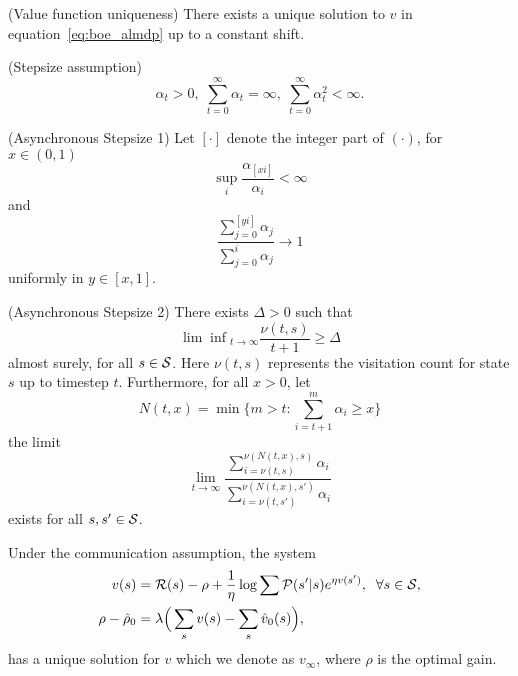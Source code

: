 
\begin{assumption}
 (Value function uniqueness) There exists a unique solution to $v$ in equation~\eqref{eq:boe_almdp} up to a constant shift.
  \label{ass:uniqueness}
\end{assumption}
\begin{assumption} (Stepsize assumption)
    \begin{equation*}
        \alpha_t > 0,\;\sum_{t=0}^{\infty} \alpha_t = \infty,\;\sum_{t=0}^{\infty} \alpha_t^2 < \infty.
    \end{equation*}
      \label{ass:stepsize1}
\end{assumption}
\begin{assumption}
    (Asynchronous Stepsize 1) Let $[\cdot]$ denote the integer part of $(\cdot)$, for $x\in(0, 1)$
    \begin{equation*}
        \sup_i \frac{\alpha_{[xi]}}{\alpha_i} < \infty
    \end{equation*}
    and
    \begin{equation*}
        \frac{\sum_{j=0}^{[yi]}\alpha_j}{\sum_{j=0}^i\alpha_j}\rightarrow 1
    \end{equation*}
    \label{ass:stepsize2}
    uniformly in $y \in[x, 1]$.
\end{assumption}

\begin{assumption}
    (Asynchronous Stepsize 2) There exists $\Delta>0$ such that
    \begin{equation*}
        {\lim\inf}_{t\rightarrow\infty} \frac{\nu(t, s)}{t+1}\geq \Delta
    \end{equation*}
    almost surely, for all $s\in\mathcal{S}$. Here $\nu(t, s)$ represents the visitation count for state $s$ up to timestep $t$. Furthermore, for all $x > 0$, let
    \begin{equation*}
        N(t, x) = \min \Big\{m > t: \sum_{i=t+1}^m \alpha_i \geq x \Big\}
    \end{equation*}
    \label{ass:stepsize3}
    the limit 
    \begin{equation*}
       \lim_{t\rightarrow\infty} \frac{\sum_{i=\nu(t, s)}^{\nu(N(t, x), s)} \alpha_i}{\sum_{i=\nu(t, s')}^{\nu(N(t, x), s')} \alpha_i}
    \end{equation*}
    exists for all $s, s'\in\mathcal{S}$.
\end{assumption}

Under the communication assumption, the system
\begin{align}
    v(s) &= \mathcal{R}(s) - \rho + \frac{1}{\eta} \log \sum {\mathcal{P}(s'\lvert s) e^{\eta v(s')}},\;\;\forall s\in\mathcal{S}, \\
    \rho - \hat\rho_0 &= \lambda \Big(\sum_s v(s) - \sum_s\hat v_0(s)\Big),
\end{align}
has a unique solution for $v$ which we denote as $v_\infty$, where $\rho$ is the optimal gain.

